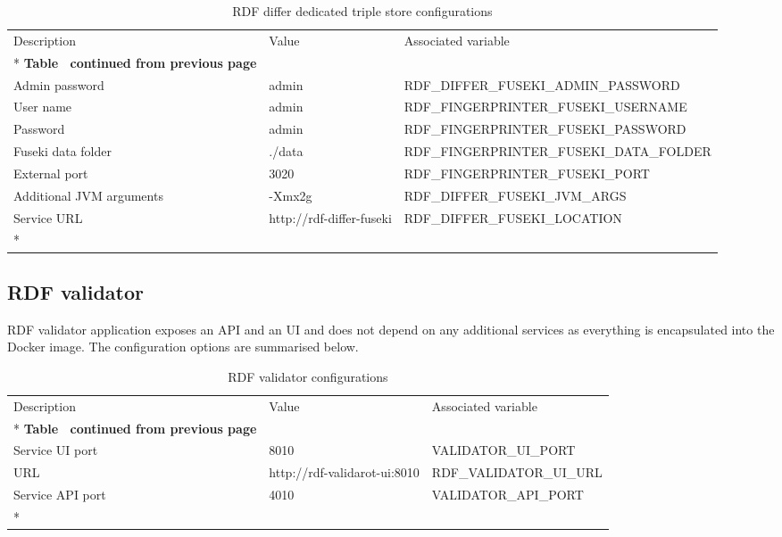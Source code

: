 	
	\begin{longtable}[c]{@{}p{4cm}p{2.5cm}l@{}}
		\toprule
		Description & Value & Associated variable \\* \midrule
		\endfirsthead
		\multicolumn{3}{c}%
		{{\bfseries Table \thetable\ continued from previous page}} \\
		\endhead
		\bottomrule
		\endfoot
		\endlastfoot
		Admin password & admin & \footnotesize RDF\_DIFFER\_FUSEKI\_ADMIN\_PASSWORD \\
		User name & admin & \footnotesize RDF\_FINGERPRINTER\_FUSEKI\_USERNAME \\
		Password & admin & \footnotesize RDF\_FINGERPRINTER\_FUSEKI\_PASSWORD \\
		Fuseki data folder & ./data & \footnotesize RDF\_FINGERPRINTER\_FUSEKI\_DATA\_FOLDER \\
		External port & 3020 & \footnotesize RDF\_FINGERPRINTER\_FUSEKI\_PORT \\
		Additional JVM arguments & -Xmx2g & \footnotesize RDF\_DIFFER\_FUSEKI\_JVM\_ARGS \\
		Service URL & http://rdf-differ-fuseki & \footnotesize RDF\_DIFFER\_FUSEKI\_LOCATION \\* \bottomrule
		\caption{RDF differ dedicated triple store configurations}
		\label{tab:my-table8}\\
	\end{longtable}

	
	\subsection{RDF validator}
	
	RDF validator application exposes an API and an UI and does not depend on any additional services as everything is encapsulated into the Docker image. The configuration options are summarised below. 
	
	\begin{longtable}[c]{@{}p{4cm}p{5cm}l@{}}
		\toprule
		Description & Value & Associated variable \\* \midrule
		\endfirsthead
		\multicolumn{3}{c}%
		{{\bfseries Table \thetable\ continued from previous page}} \\
		\endhead
		\bottomrule
		\endfoot
		\endlastfoot
		Service UI port & 8010 & VALIDATOR\_UI\_PORT \\
		URL & http://rdf-validarot-ui:8010 & RDF\_VALIDATOR\_UI\_URL \\
		Service API port & 4010 & VALIDATOR\_API\_PORT \\* \bottomrule
		\caption{RDF validator configurations}
		\label{tab:my-table3}\\
	\end{longtable}

